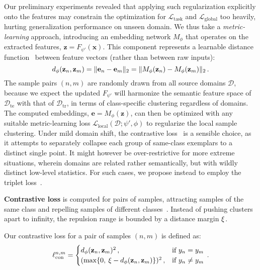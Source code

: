 \documentclass{article}
\newcommand{\Domains}{\mathcal{D}}
\newcommand{\TrainDomains}{\Domains_\mathrm{tr}}
\newcommand{\TestDomains}{\Domains_\mathrm{te}}
\newcommand{\TaskLoss}{\mathcal{L}_\mathrm{task}}
\newcommand{\LabelLoss}{\mathcal{L}_\mathrm{global}}
\newcommand{\MetricLoss}{\mathcal{L}_\mathrm{local}}
\DeclarePairedDelimiter{\norm}{\lVert}{\rVert}
\def\*#1{\mathbf{#1}}
\begin{document}
Our preliminary experiments revealed that applying such regularization explicitly onto the features may constrain the optimization for $\TaskLoss$ and $\LabelLoss$ too heavily, hurting generalization performance on unseen domain. We thus take a \emph{metric-learning} approach, introducing an embedding network $M_\phi$ that operates on the extracted features, $\*z=F_{\psi'}(\*x)$. This component represents a learnable distance function~\citep{chopra2005learning} between feature vectors (rather than between raw inputs):
\begin{equation}
    d_\phi(\*z_n, \*z_m) = \norm{\*e_n - \*e_m}_2
        = \norm{M_\phi(\*z_n) - M_\phi(\*z_m)}_2 \,.
\end{equation}
The sample pairs $(n,m)$ are randomly drawn from all source domains $\Domains$, because we expect the updated $F_{\psi'}$ will harmonize the semantic feature space of $\TestDomains$ with that of $\TrainDomains$, in terms of class-specific clustering regardless of domains.
The computed embeddings, $\*e=M_\phi(\*z)$, can then be optimized with any suitable metric-learning loss $\MetricLoss(\Domains; \psi', \phi)$ to regularize the local sample clustering.
Under mild domain shift, the contrastive loss~\citep{hadsell2006dimensionality} is a sensible choice, as it attempts to separately collapse each group of same-class exemplars to a distinct single point. It might however be over-restrictive for more extreme situations, wherein domains are related rather semantically, but with wildly distinct low-level statistics. For such cases, we propose instead to employ the triplet loss~\citep{schroff2015facenet}.

\vspace{1mm}

\textbf{Contrastive loss}
is computed for pairs of samples, attracting samples of the same class and repelling samples of different classes~\citep{hadsell2006dimensionality}. Instead of pushing clusters apart to infinity, the repulsion range is bounded by a distance margin $\xi$. 

Our contrastive loss for a pair of samples $(n,m)$ is defined as:
\begin{equation}
\ell_\mathrm{con}^{n,m} = \begin{cases}
        d_\phi(\*z_n,\*z_m)^2\,,                         & \text{if } y_n=y_m \\
        (\max\{0,\:\Margin-d_\phi(\*z_n,\*z_m)\})^2\,,   & \text{if } y_n\neq y_m
    \end{cases} \,.
\end{equation}
\end{document}
